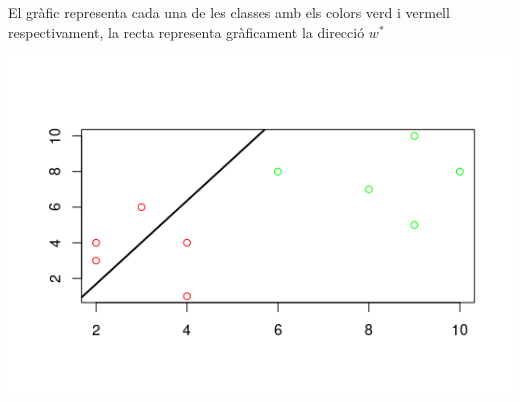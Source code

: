 \documentclass[a4paper]{article}
\begin{document}
El gràfic representa cada una de les classes amb els colors verd i vermell respectivament, la recta representa gràficament la direcció $w^*$

\includegraphics[scale=0.5]{plot}\centering
\end{document}
